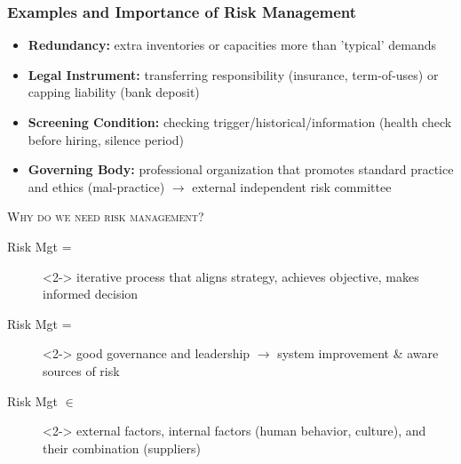\documentclass[10pt,presentation]{beamer}
\begin{document}
\begin{frame}
  \frametitle{Examples and Importance of Risk Management}

  \begin{itemize}
    \item \textbf{Redundancy:} extra inventories or capacities more than 'typical' demands
    \item \textbf{Legal Instrument:} transferring responsibility (insurance, term-of-uses) or capping liability (bank deposit)
    \item \textbf{Screening Condition:} checking trigger/historical/information (health check before hiring, silence period)
    \item \textbf{Governing Body:} professional organization that promotes standard practice and ethics (mal-practice) $\rightarrow$ external independent risk committee
  \end{itemize}

  \NextLine
  \textsc{Why do we need risk management?}
  \begin{flushleft} \small{
  \begin{description}
    \item[Risk Mgt =]<2-> \alert{iterative process} that aligns strategy, achieves objective, makes informed decision
    \item[Risk Mgt =]<2->  \alert{good governance} and \alert{leadership} $\rightarrow$ system improvement \& aware \alert{sources of risk}
    \item[Risk Mgt $\in$]<2-> external factors, internal factors (human behavior, culture), and their combination (suppliers)
  \end{description} }
  \end{flushleft}


\end{frame}
\end{document}
